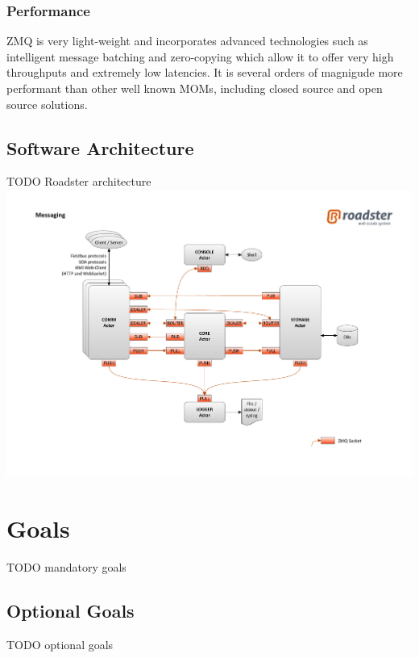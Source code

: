 \subsubsection{Performance}
ZMQ is very light-weight and incorporates advanced technologies such as intelligent
message batching and zero-copying which allow it to offer very high throughputs
and extremely low latencies. It is several orders of magnigude more performant
than other well known MOMs, including closed source and open source
solutions.\\

\subsection{Software Architecture}
TODO Roadster architecture\\

\includegraphics[trim=4cm 2cm 3.5cm 2.8cm, clip=true, width=\textwidth]{img/roadster_arch.pdf}

\section{Goals}
TODO mandatory goals

\subsection*{Optional Goals}
TODO optional goals
